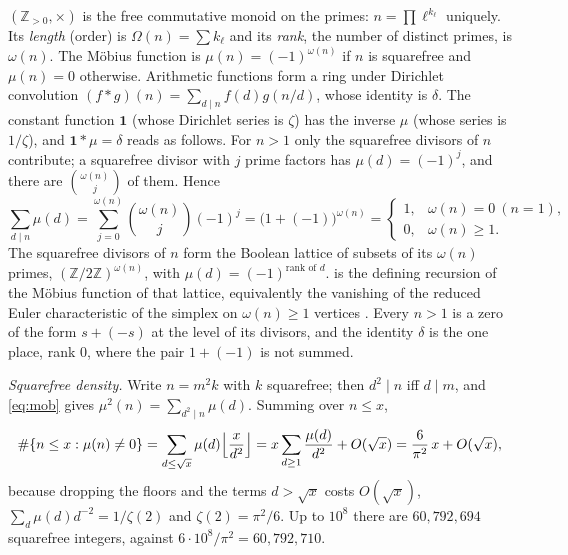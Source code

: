 \documentclass[11pt]{article}
\theoremstyle{definition}\newtheorem{definition}[theorem]{Definition}
\theoremstyle{remark}\newtheorem{remark}[theorem]{Remark}
\begin{document}
$(\mathbb Z_{>0},\times)$ is the free commutative monoid on the primes: $n=\prod\ell^{k_\ell}$ uniquely. Its \emph{length} (order) is $\Omega(n)=\sum k_\ell$ and its \emph{rank}, the number of distinct primes, is $\omega(n)$. The M\"obius function is $\mu(n)=(-1)^{\omega(n)}$ if $n$ is squarefree and $\mu(n)=0$ otherwise. Arithmetic functions form a ring under Dirichlet convolution $(f*g)(n)=\sum_{d\mid n}f(d)g(n/d)$, whose identity is $\delta$. The constant function $\mathbf1$ (whose Dirichlet series is $\zeta$) has the inverse $\mu$ (whose series is $1/\zeta$), and $\mathbf1*\mu=\delta$ reads as follows. For $n>1$ only the squarefree divisors of $n$ contribute; a squarefree divisor with $j$ prime factors has $\mu(d)=(-1)^j$, and there are $\binom{\omega(n)}{j}$ of them. Hence
\begin{equation}\label{eq:mob}
\sum_{d\mid n}\mu(d)=\sum_{j=0}^{\omega(n)}\binom{\omega(n)}{j}(-1)^j=\bigl(1+(-1)\bigr)^{\omega(n)}=\begin{cases}1,&\omega(n)=0\ (n=1),\\0,&\omega(n)\ge1.\end{cases}
\end{equation}
The squarefree divisors of $n$ form the Boolean lattice of subsets of its $\omega(n)$ primes, $(\mathbb Z/2\mathbb Z)^{\omega(n)}$, with $\mu(d)=(-1)^{\text{rank of }d}$.  is the defining recursion of the M\"obius function of that lattice, equivalently the vanishing of the reduced Euler characteristic of the simplex on $\omega(n)\ge1$ vertices \cite{Rota}. Every $n>1$ is a zero of the form $s+(-s)$ at the level of its divisors, and the identity $\delta$ is the one place, rank $0$, where the pair $1+(-1)$ is not summed.

\emph{Squarefree density.} Write $n=m^2k$ with $k$ squarefree; then $d^2\mid n$ iff $d\mid m$, and \eqref{eq:mob} gives $\mu^2(n)=\sum_{d^2\mid n}\mu(d)$. Summing over $n\le x$,
\[
\#\{n\le x:\mu(n)\ne0\}=\sum_{d\le\sqrt x}\mu(d)\Bigl\lfloor\frac x{d^2}\Bigr\rfloor=x\sum_{d\ge1}\frac{\mu(d)}{d^2}+O(\sqrt x)=\frac{6}{\pi^2}\,x+O(\sqrt x),
\]
because dropping the floors and the terms $d>\sqrt x$ costs $O(\sqrt x)$, $\sum_d\mu(d)d^{-2}=1/\zeta(2)$ and $\zeta(2)=\pi^2/6$. Up to $10^8$ there are $60{,}792{,}694$ squarefree integers, against $6\cdot10^8/\pi^2=60{,}792{,}710$.
\end{document}
